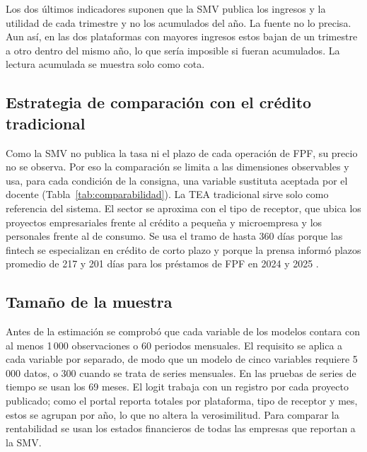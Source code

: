 Los dos últimos indicadores suponen que la SMV publica los ingresos y la utilidad de cada trimestre y no los acumulados del año. La fuente no lo precisa. Aun así, en las dos plataformas con mayores ingresos estos bajan de un trimestre a otro dentro del mismo año, lo que sería imposible si fueran acumulados. La lectura acumulada se muestra solo como cota.

\subsection{Estrategia de comparación con el crédito tradicional}

Como la SMV no publica la tasa ni el plazo de cada operación de FPF, su precio no se observa. Por eso la comparación se limita a las dimensiones observables y usa, para cada condición de la consigna, una variable sustituta aceptada por el docente (Tabla~\ref{tab:comparabilidad}). La TEA tradicional sirve solo como referencia del sistema. El sector se aproxima con el tipo de receptor, que ubica los proyectos empresariales frente al crédito a pequeña y microempresa y los personales frente al de consumo. Se usa el tramo de hasta 360 días porque las fintech se especializan en crédito de corto plazo \parencite{serfes2025} y porque la prensa informó plazos promedio de 217 y 201 días para los préstamos de FPF en 2024 y 2025 \parencite{ramirez2026}.

\begin{table}[!t]
\caption{Comparabilidad entre el financiamiento participativo financiero y el crédito tradicional}
\label{tab:comparabilidad}
\small

\end{table}

\subsection{Tamaño de la muestra}

Antes de la estimación se comprobó que cada variable de los modelos contara con al menos 1\,000 observaciones o 60 periodos mensuales. El requisito se aplica a cada variable por separado, de modo que un modelo de cinco variables requiere 5\,000 datos, o 300 cuando se trata de series mensuales. En las pruebas de series de tiempo se usan los 69 meses. El logit trabaja con un registro por cada proyecto publicado; como el portal reporta totales por plataforma, tipo de receptor y mes, estos se agrupan por año, lo que no altera la verosimilitud. Para comparar la rentabilidad se usan los estados financieros de todas las empresas que reportan a la SMV.

